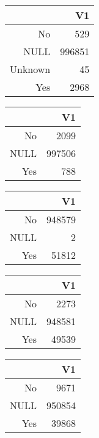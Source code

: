 \bigskip\bigskip
\centering
\begin{tabular}{rr}
  \hline
 & V1 \\ 
  \hline
No & 529 \\ 
  NULL & 996851 \\ 
  Unknown &  45 \\ 
  Yes & 2968 \\ 
   \hline
\end{tabular}

\bigskip\bigskip
\centering
\begin{tabular}{rr}
  \hline
 & V1 \\ 
  \hline
No & 2099 \\ 
  NULL & 997506 \\ 
  Yes & 788 \\ 
   \hline
\end{tabular}

\bigskip\bigskip
\centering
\begin{tabular}{rr}
  \hline
 & V1 \\ 
  \hline
No & 948579 \\ 
  NULL &   2 \\ 
  Yes & 51812 \\ 
   \hline
\end{tabular}

\bigskip\bigskip
\centering
\begin{tabular}{rr}
  \hline
 & V1 \\ 
  \hline
No & 2273 \\ 
  NULL & 948581 \\ 
  Yes & 49539 \\ 
   \hline
\end{tabular}

\bigskip\bigskip
\centering
\begin{tabular}{rr}
  \hline
 & V1 \\ 
  \hline
No & 9671 \\ 
  NULL & 950854 \\ 
  Yes & 39868 \\ 
   \hline
\end{tabular}

